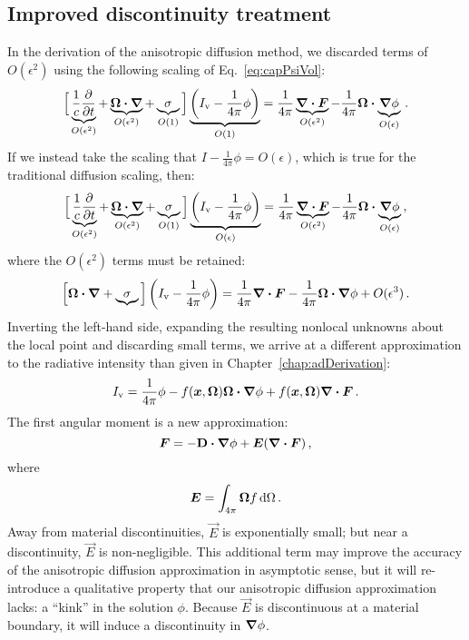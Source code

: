 \subsection{Improved discontinuity treatment}
In the derivation of the anisotropic diffusion method, we discarded
terms of $O(\epsilon^2)$ using the following scaling of Eq.~\eqref{eq:capPsiVol}:
\begin{equation*}
  \Big[ \underbrace{\frac{1}{c}\frac{\partial }{\partial t}}_{O(\epsilon^2)}
  + \underbrace{\bm{\Omega}\bm{\cdot} \bm{\nabla}}_{O(\epsilon^2)}
  + \underbrace{\sigma}_{O(1)} \Big]
   \underbrace{\left( I_\mathrm{v}
  - \frac{1}{4\pi} \phi \right)}_{O(1)}
  = \frac{1}{4\pi}  \underbrace{\bm{\nabla} \bm{\cdot}\bm{F}}_{O(\epsilon^2)} -
  \frac{1}{4\pi} \bm{\Omega}\bm{\cdot}  \underbrace{\bm{\nabla} \phi}_{O(\epsilon)}\,.
\end{equation*}
If we instead take the scaling that $I - \frac{1}{4\pi}\phi=
O(\epsilon)$, which is true for the traditional diffusion scaling, then:
\begin{equation*}
  \Big[ \underbrace{\frac{1}{c}\frac{\partial }{\partial t}}_{O(\epsilon^2)}
  + \underbrace{\bm{\Omega}\bm{\cdot} \bm{\nabla}}_{O(\epsilon^2)}
  + \underbrace{\sigma}_{O(1)} \Big]
   \underbrace{\left( I_\mathrm{v}
  - \frac{1}{4\pi} \phi \right)}_{O(\epsilon)}
  = \frac{1}{4\pi}  \underbrace{\bm{\nabla} \bm{\cdot}\bm{F}}_{O(\epsilon^2)} -
  \frac{1}{4\pi} \bm{\Omega}\bm{\cdot}  \underbrace{\bm{\nabla} \phi}_{O(\epsilon)}\,,
\end{equation*}
where the $O(\epsilon^2)$ terms must be retained:
\begin{equation*}
  \Big[ \bm{\Omega}\bm{\cdot} \bm{\nabla}
  + \underbrace{\sigma} \Big]
   \left( I_\mathrm{v} - \frac{1}{4\pi} \phi \right)
  = \frac{1}{4\pi}  \bm{\nabla} \bm{\cdot}\bm{F}
 - \frac{1}{4\pi} \bm{\Omega}\bm{\cdot}  \bm{\nabla} \phi + O(\epsilon^3)\,.
\end{equation*}
Inverting the left-hand side, expanding the resulting nonlocal unknowns about
the local point and discarding small terms, we arrive at a different
approximation to the radiative intensity than given in
Chapter~\ref{chap:adDerivation}:
\begin{equation*}
  I_\mathrm{v} = \frac{1}{4\pi} \phi - f(\bm{x},\bm{\Omega}) \bm{\Omega}\bm{\cdot}  \bm{\nabla} \phi 
  + f(\bm{x},\bm{\Omega})\bm{\nabla} \bm{\cdot}\bm{F} \,.
\end{equation*}
The first angular moment is a new approximation:
\begin{equation*}
  \bm{F} = - \mathbf{D} \bm{\cdot} \bm{\nabla} \phi + \bm{E} (\bm{\nabla} \bm{\cdot}\bm{F})\,,
\end{equation*}
where
\begin{equation*}
  \bm{E} = \int_{4\pi} \bm{\Omega} f \mathop{}\!\mathrm{d}\Omega\,.
\end{equation*}
Away from material discontinuities, $\vec{E}$ is exponentially small; but
near a discontinuity, $\vec{E}$ is non-negligible. This additional term may
improve the accuracy of the anisotropic diffusion approximation in asymptotic
sense, but it will re-introduce a qualitative property that our anisotropic
diffusion approximation lacks: a ``kink'' in the solution $\phi$. Because
$\vec{E}$ is discontinuous at a material boundary, it will induce a
discontinuity in $\bm{\nabla} \phi$.

